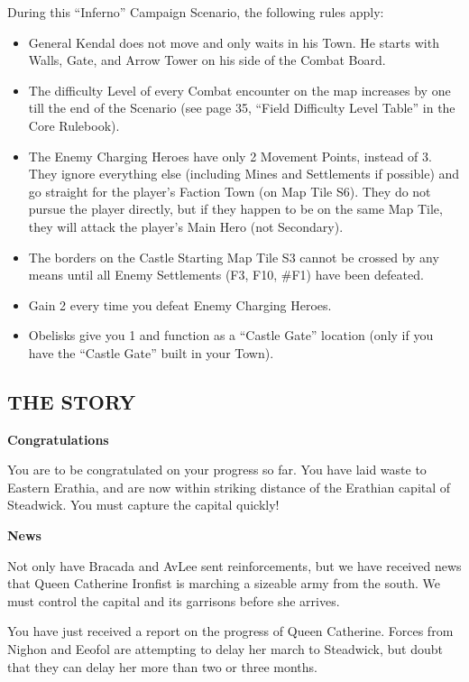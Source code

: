 \begin{multicols*}{2}
During this ``Inferno'' Campaign Scenario, the following rules apply:

\begin{itemize}
    \item General Kendal does not move and only waits in his Town. He starts with Walls, Gate,
      and Arrow Tower on his side of the Combat Board.
    \item The difficulty Level of every Combat encounter on the map increases by one till the end of the Scenario
      (see page 35, ``Field Difficulty Level Table'' in the Core Rulebook).
    \item The Enemy Charging Heroes have only 2 Movement Points, instead of 3. They ignore everything else
      (including Mines and Settlements if possible) and go straight for the player's Faction Town (on Map Tile S6).
      They do not pursue the player directly, but if they happen to be on the same Map Tile, they will
      attack the player's Main Hero (not Secondary).
    \item The borders on the Castle Starting Map Tile S3 cannot be crossed by any means until
      all Enemy Settlements (F3, F10, \#F1) have been defeated.
    \item Gain 2  every time you defeat Enemy Charging Heroes.
    \item Obelisks give you 1  and function as a ``Castle Gate'' location (only if you have the ``Castle Gate'' built in your Town).
\end{itemize}

\subsection*{\MakeUppercase{The Story}}

\textbf{Congratulations}

You are to be congratulated on your progress so far.
You have laid waste to Eastern Erathia, and are now within striking distance of the Erathian capital of Steadwick.
You must capture the capital quickly!

\textbf{News}

Not only have Bracada and AvLee sent reinforcements, but we have received news that Queen Catherine Ironfist is marching a sizeable army from the south.
We must control the capital and its garrisons before she arrives.

You have just received a report on the progress of Queen Catherine.
Forces from Nighon and Eeofol are attempting to delay her march to Steadwick, but doubt that they can delay her more than two or three months.


\end{multicols*}
